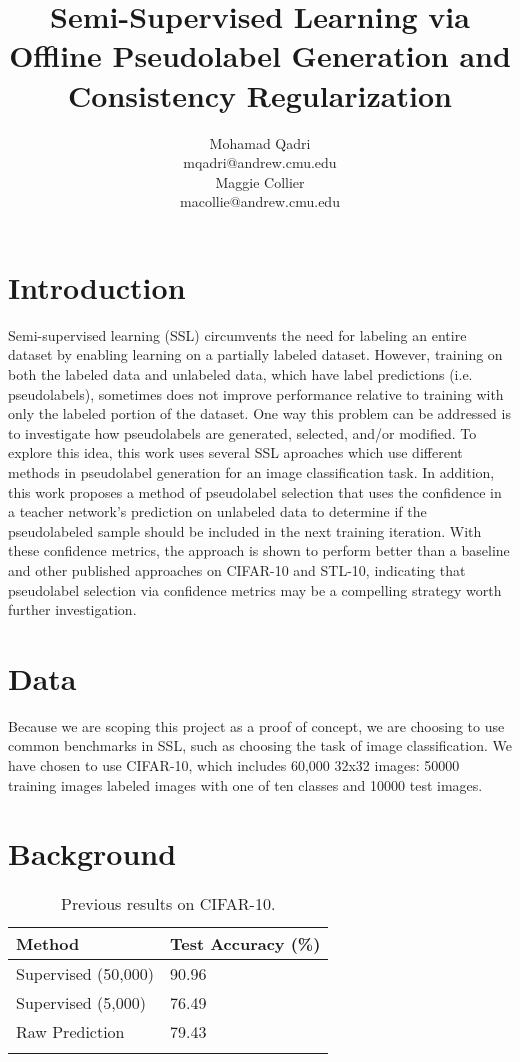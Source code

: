 \documentclass{article}
\title{Semi-Supervised Learning via Offline Pseudolabel Generation and Consistency Regularization}
\author{%
  Mohamad Qadri \\
  mqadri@andrew.cmu.edu\\
  \And Maggie Collier\\
  macollie@andrew.cmu.edu\\
}
\begin{document}
\maketitle
\section{Introduction}
Semi-supervised learning (SSL) circumvents the need for labeling an entire dataset by enabling learning on a partially labeled dataset. However, training on both the labeled data and unlabeled data, which have label predictions (i.e. pseudolabels), sometimes does not improve performance relative to training with only the labeled portion of the dataset. One way this problem can be addressed is to investigate how pseudolabels are generated, selected, and/or modified. To explore this idea, this work uses several SSL aproaches which use different methods in pseudolabel generation for an image classification task. In addition, this work proposes a method of pseudolabel selection that uses the confidence in a teacher network's prediction on unlabeled data to determine if the pseudolabeled sample should be included in the next training iteration. With these confidence metrics, the approach is shown to perform better than a baseline and other published approaches on CIFAR-10 and STL-10, indicating that pseudolabel selection via confidence metrics may be a compelling strategy worth further investigation.

\section{Data}
Because we are scoping this project as a proof of concept, we are choosing to use common benchmarks in SSL, such as choosing the task of image classification. We have chosen to use CIFAR-10, which includes 60,000 32x32 images: 50000 training images labeled images with one of ten classes and 10000 test images. 

\section{Background}

\begin{wraptable}{r}[-0.5cm]{6cm}
\vspace{-\baselineskip}
\caption{Previous results on CIFAR-10.}
\label{prev_results}
\centering
\begin{tabular}{p{3cm}P{2.75cm}}
\toprule
Method & Test Accuracy (\%) \\
\midrule
Supervised (50,000) & 90.96 \\
Supervised (5,000) & 76.49 \\
Raw Prediction & 79.43 \\
\bottomrule\\
\end{tabular}
\end{wraptable}
\end{document}
